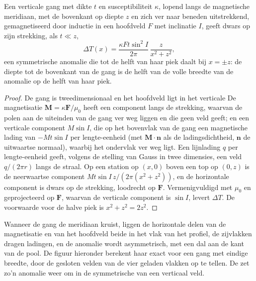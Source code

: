 \begin{proposition}\label{prop:b3:field-lab-methods-3:dyke}
Een verticale gang met dikte $t$ en susceptibiliteit $\kappa$, lopend
langs de magnetische meridiaan, met de bovenkant op diepte $z$ en zich ver
naar beneden uitstrekkend, gemagnetiseerd door inductie in een hoofdveld $F$ met inclinatie $I$,
geeft dwars op zijn strekking, als $t \ll z$,
\[
\Delta T(x) = \frac{\kappa F t\sin^2 I}{2\pi}\,\frac{z}{x^2 + z^2} ,
\]
een symmetrische anomalie die tot de helft van haar piek daalt bij $x = \pm z$: de
diepte tot de bovenkant van de gang is de helft van de volle breedte van de anomalie op
de helft van haar piek.
\end{proposition}

\begin{proof}
De gang is tweedimensionaal en het hoofdveld ligt in het verticale
De magnetisatie $\mathbf{M} = \kappa\mathbf{F}/\mu_0$
heeft een component langs de strekking, waarvan de polen aan de uiteinden van de
gang ver weg liggen en die geen veld geeft; en een verticale component $M
\sin I$, die op het bovenvlak van de gang een magnetische lading van
$-Mt\sin I$ per lengte-eenheid (met $\mathbf{M}\cdot\mathbf{n}$ als de
ladingsdichtheid, $\mathbf{n}$ de uitwaartse normaal), waarbij het ondervlak
ver weg ligt. Een lijnlading $q$ per lengte-eenheid geeft, volgens de stelling van Gauss
in twee dimensies, een veld $q/(2\pi r)$ langs de straal. Op een
station op $(x, 0)$ boven een top op $(0, z)$ is de neerwaartse component
$Mt\sin I\,z/(2\pi(x^2 + z^2))$, en de horizontale component is
dwars op de strekking, loodrecht op $\mathbf{F}$. Vermenigvuldigd met
$\mu_0$ en geprojecteerd op $\mathbf{F}$, waarvan de verticale component is
$\sin I$, levert $\Delta T$. De voorwaarde voor de halve piek is $x^2 + z^2 =
2z^2$.
\end{proof}

Wanneer de gang de meridiaan kruist, liggen de horizontale delen van de
magnetisatie en van het hoofdveld beide in het vlak van het
profiel, de zijvlakken dragen ladingen, en de anomalie wordt
asymmetrisch, met een dal aan de kant van de pool. De figuur hieronder
berekent haar exact voor een gang met eindige breedte, door de gesloten
velden van de vier geladen vlakken op te tellen. De  zet zo'n
anomalie weer om in de symmetrische van een verticaal veld.

